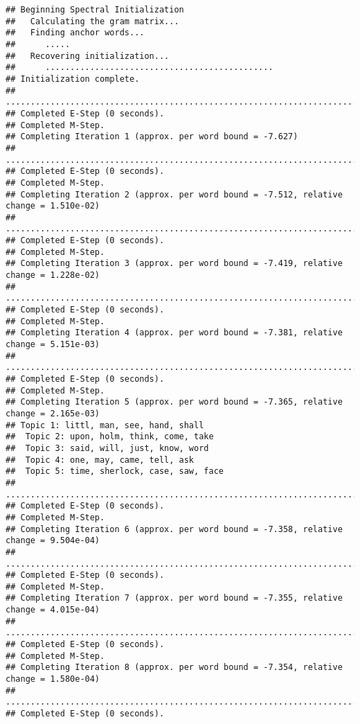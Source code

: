 \documentclass[
]{book}
\begin{document}
\begin{verbatim}
## Beginning Spectral Initialization 
##   Calculating the gram matrix...
##   Finding anchor words...
##      .....
##   Recovering initialization...
##      ..............................................
## Initialization complete.
## ....................................................................................................
## Completed E-Step (0 seconds). 
## Completed M-Step. 
## Completing Iteration 1 (approx. per word bound = -7.627) 
## ....................................................................................................
## Completed E-Step (0 seconds). 
## Completed M-Step. 
## Completing Iteration 2 (approx. per word bound = -7.512, relative change = 1.510e-02) 
## ....................................................................................................
## Completed E-Step (0 seconds). 
## Completed M-Step. 
## Completing Iteration 3 (approx. per word bound = -7.419, relative change = 1.228e-02) 
## ....................................................................................................
## Completed E-Step (0 seconds). 
## Completed M-Step. 
## Completing Iteration 4 (approx. per word bound = -7.381, relative change = 5.151e-03) 
## ....................................................................................................
## Completed E-Step (0 seconds). 
## Completed M-Step. 
## Completing Iteration 5 (approx. per word bound = -7.365, relative change = 2.165e-03) 
## Topic 1: littl, man, see, hand, shall 
##  Topic 2: upon, holm, think, come, take 
##  Topic 3: said, will, just, know, word 
##  Topic 4: one, may, came, tell, ask 
##  Topic 5: time, sherlock, case, saw, face 
## ....................................................................................................
## Completed E-Step (0 seconds). 
## Completed M-Step. 
## Completing Iteration 6 (approx. per word bound = -7.358, relative change = 9.504e-04) 
## ....................................................................................................
## Completed E-Step (0 seconds). 
## Completed M-Step. 
## Completing Iteration 7 (approx. per word bound = -7.355, relative change = 4.015e-04) 
## ....................................................................................................
## Completed E-Step (0 seconds). 
## Completed M-Step. 
## Completing Iteration 8 (approx. per word bound = -7.354, relative change = 1.580e-04) 
## ....................................................................................................
## Completed E-Step (0 seconds). 

\end{verbatim}
\end{document}
